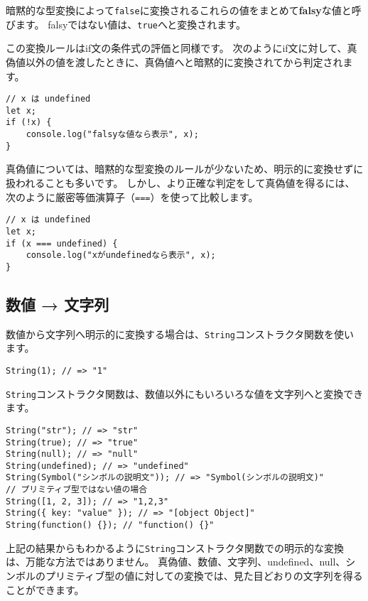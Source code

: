 暗黙的な型変換によって\texttt{false}に変換されるこれらの値をまとめて\textbf{falsy}な値と呼びます。
falsyではない値は、\texttt{true}へと変換されます。

この変換ルールはif文の条件式の評価と同様です。
次のようにif文に対して、真偽値以外の値を渡したときに、真偽値へと暗黙的に変換されてから判定されます。

\begin{lstlisting}
// x は undefined
let x; 
if (!x) {
    console.log("falsyな値なら表示", x); 
}
\end{lstlisting}

真偽値については、暗黙的な型変換のルールが少ないため、明示的に変換せずに扱われることも多いです。
しかし、より正確な判定をして真偽値を得るには、次のように厳密等価演算子（\texttt{===}）を使って比較します。\enlargethispage{\baselineskip}

\begin{lstlisting}
// x は undefined
let x;
if (x === undefined) {
    console.log("xがundefinedなら表示", x); 
}
\end{lstlisting}

\hypertarget{number-to-string}{%
\subsection{数値 → 文字列}\label{number-to-string}}

数値から文字列へ明示的に変換する場合は、\texttt{String}コンストラクタ関数を使います。

\begin{lstlisting}
String(1); // => "1"
\end{lstlisting}

\texttt{String}コンストラクタ関数は、数値以外にもいろいろな値を文字列へと変換できます。

\begin{lstlisting}
String("str"); // => "str"
String(true); // => "true"
String(null); // => "null"
String(undefined); // => "undefined"
String(Symbol("シンボルの説明文")); // => "Symbol(シンボルの説明文)"
// プリミティブ型ではない値の場合
String([1, 2, 3]); // => "1,2,3"
String({ key: "value" }); // => "[object Object]"
String(function() {}); // "function() {}"
\end{lstlisting}

上記の結果からもわかるように\texttt{String}コンストラクタ関数での明示的な変換は、万能な方法ではありません。
真偽値、数値、文字列、undefined、null、シンボルのプリミティブ型の値に対しての変換では、見た目どおりの文字列を得ることができます。

